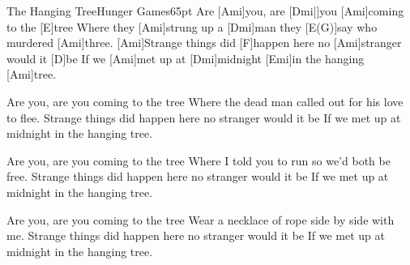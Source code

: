 \begin{song}{The Hanging Tree}{Hunger Games}{65pt}
%
Are [Ami]you, are [Dmi|]{you} [Ami]coming to the [E]tree
Where they [Ami]strung up a [Dmi]man they [E(G)]say who murdered [Ami]three.
[Ami]Strange things did [F]happen here no [Ami]stranger would it [D]be
If we [Ami]met up at [Dmi]midnight [Emi]in the hanging [Ami]tree.

%
Are you, are you coming to the tree
Where the dead man called out for his love to flee.
Strange things did happen here no stranger would it be
If we met up at midnight in the hanging tree.

%
Are you, are you coming to the tree
Where I told you to run so we'd both be free.
Strange things did happen here no stranger would it be
If we met up at midnight in the hanging tree.

%
Are you, are you coming to the tree
Wear a necklace of rope side by side with me.
Strange things did happen here no stranger would it be
If we met up at midnight in the hanging tree.
\end{song}
